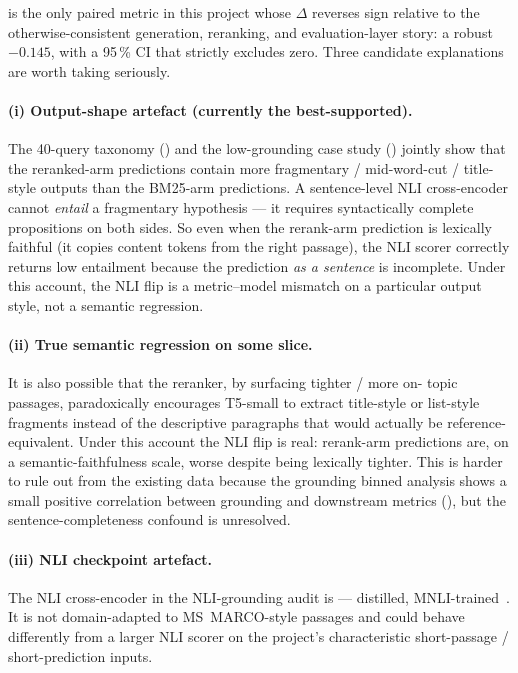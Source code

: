 \documentclass[11pt,a4paper]{article}
\newcommand{\msmarco}{MS~MARCO}
\newcommand{\bmtwofive}{BM25}
\begin{document}
 is the only paired metric in this project whose
$\Delta$ reverses sign relative to the otherwise-consistent generation,
reranking, and evaluation-layer
story: a robust $-0.145$, with a 95\,\% CI that strictly excludes
zero.  Three candidate explanations are worth taking seriously.

\paragraph{(i) Output-shape artefact (currently the best-supported).}
The 40-query taxonomy () and the low-grounding case
study () jointly show that the reranked-arm
predictions contain more fragmentary / mid-word-cut / title-style
outputs than the \bmtwofive{}-arm predictions.  A sentence-level
NLI cross-encoder cannot \emph{entail} a fragmentary hypothesis ---
it requires syntactically complete propositions on both sides.  So
even when the rerank-arm prediction is lexically faithful (it
copies content tokens from the right passage), the NLI scorer
correctly returns low entailment because the prediction \emph{as
a sentence} is incomplete.  Under this account, the NLI flip is a
metric--model mismatch on a particular output style, not a
semantic regression.

\paragraph{(ii) True semantic regression on some slice.}  It is
also possible that the reranker, by surfacing tighter / more on-
topic passages, paradoxically encourages T5-small to extract
title-style or list-style fragments instead of the descriptive
paragraphs that would actually be reference-equivalent.  Under this
account the NLI flip is real: rerank-arm predictions are, on a
semantic-faithfulness scale, worse despite being lexically tighter.
This is harder to rule out from the existing data because the grounding
binned analysis shows a small positive correlation between
grounding and downstream metrics (), but the
sentence-completeness confound is unresolved.

\paragraph{(iii) NLI checkpoint artefact.}  The NLI cross-encoder
in the NLI-grounding audit is \texttt{} ---
distilled, MNLI-trained~\cite{he2023debertav3,williams2018mnli}.
It is not domain-adapted to \msmarco{}-style passages and could
behave differently from a larger NLI scorer on the project's
characteristic short-passage / short-prediction inputs.
\end{document}
